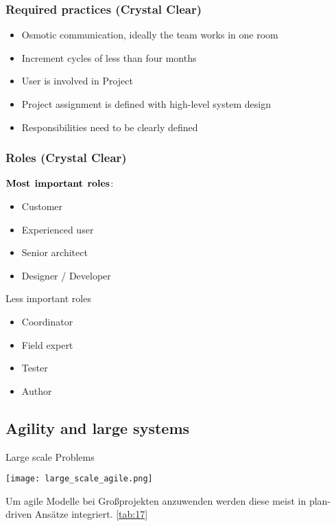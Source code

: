 \subsubsection{Required practices (Crystal Clear)}
\begin{itemize}
	\item Osmotic communication, ideally the team works in one room
	\item Increment cycles of less than four months
	\item User is involved in Project
	\item Project assignment is defined with high-level system design
	\item Responsibilities need to be clearly defined 
\end{itemize}
\subsubsection{Roles (Crystal Clear)}
\begin{multicols}{2}
$\bold{Most}$ $\bold{important}$	 $\bold{roles}$:
\begin{itemize}
	\item Customer
	\item Experienced user
	\item Senior architect
	\item Designer / Developer
\end{itemize}
\columnbreak
Less important roles
\begin{itemize}
	\item Coordinator
	\item Field expert
	\item Tester
	\item Author
\end{itemize}
\end{multicols}
\subsection{Agility and large systems}
\begin{table}[H]
\caption{Large scale Problems}
\texttt{[image: large\_scale\_agile.png]}	
\end{table}
Um agile Modelle bei Großprojekten anzuwenden werden diese meist in plan-driven Ansätze integriert.
\newline 
\autoref{tab:17}















